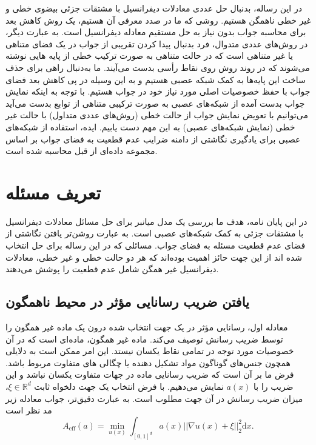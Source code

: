 در این رساله، بدنبال حل عددی معادلات دیفرانسیل با مشتقات جزئی بیضوی خطی و غیر خطی ناهمگن هستیم. روشی که ما در صدد معرفی آن هستیم، یک روش کاهش بعد برای محاسبه جواب بدون نیاز به حل مستقیم معادله دیفرانسیل است. به عبارت دیگر، در روش‌های عددی متدوال، فرد بدنبال پیدا کردن تقریبی از جواب در یک فضای متناهی یا غیر متناهی است که در حالت متناهی به صورت ترکیب خطی از پایه هایی نوشته می‌شوند که در روند روش روی نقاط رأسی بدست می‌آیند. ما به‌دنبال راهی برای حذف ساخت این پایه‌ها به کمک شبکه عصبی هستیم و به این وسیله در پی کاهش بعد فضای جواب با حفظ خصوصیات اصلی مورد نیاز خود در جواب هستیم. با توجه به اینکه نمایش جواب بدست آمده از شبکه‌های عصبی به صورت ترکیبی متناهی از توابع بدست می‌آید می‌توانیم با تعویض نمایش جواب از حالت خطی (روش‌های عددی متداول) با حالت غیر خطی (نمایش شبکه‌های عصبی) به این مهم دست یابیم. ایده، استفاده از شبکه‌های عصبی برای یادگیری نگاشتی از دامنه ضرایب عدم قطعیت به فضای جواب بر اساس مجموعه داده‌ای از قبل محاسبه شده است.
\section*{تعریف مسئله }
در این پایان نامه، هدف ما بررسی یک مدل میانبر برای حل مسائل معادلات دیفرانسیل با مشتقات جزئی به کمک شبکه‌های عصبی است. به عبارت روشن‌تر یافتن نگاشتی از فضای عدم قطعیت مسئله به فضای جواب. مسائلی که در این رساله برای حل انتخاب شده اند از این جهت حائز اهمیت بوده‌اند که هر دو حالت خطی و غیر خطی، معادلات دیفرانسیل غیر همگن شامل عدم قطعیت را پوشش می‌دهند. \\
\subsection*{یافتن ضریب رسانایی مؤثر در محیط ناهمگون}
معادله اول، رسانایی مؤثر در یک جهت انتخاب شده درون یک ماده غیر همگون را توسط ضریب رسانش توصیف می‌کند. ماده غیر همگون، ماده‌ای است که در آن خصوصیات مورد توجه در تمامی نقاط یکسان نیستد. این امر ممکن است به دلایلی همچون جنس‌های گوناگون مواد تشکیل دهنده یا چگالی های متفاوت مربوط باشد. فرض ما بر آن است که ضریب رسانایی ماده در جهات متفاوت یکسان نباشد و این ضریب را با $a(x)$ نمایش می‌دهیم. با فرض انتخاب یک جهت دلخواه ثابت $\xi \in \mathbb{R}^d$، میزان ضریب رسانش در آن جهت مطلوب است. به عبارت دقیق‌تر، جواب معادله زیر مد نظر است
\begin{equation*}
A_{\text{eff}}(a) = \min_{u(x)} \int_{[0,1]^d} a(x) ||\nabla u(x) + \xi||_{2}^{2} \mathrm{d}x.
\end{equation*}
